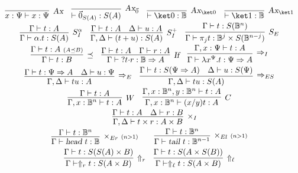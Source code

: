\documentclass[preprint]{elsarticle}
\newcommand\B{\ensuremath{\mathbb B}}
\newcommand\gB{\ensuremath{\Psi}}
\newcommand\ite[3]{{#1}?{#2}\mathord{\cdot}{#3}}
\newcommand\pair[2]{({#1}+{#2})}
\newcommand\head{\text{\sl head}}
\newcommand\tail{\text{\sl tail}}
\newcommand\z[1][A]{\vec 0_{S(#1)}}
\newcommand\tax{\textsl{Ax}}
\newcommand\tif{\textsl{If}}
\begin{document}
\begin{table}
  \centering
  \[
    \def\arraystretch{1.5}
    \begin{array}{c}
      \infer[\tax]
      {x:\gB\vdash x:\gB}
      {}
      \quad
      \infer[\tax_{\vec 0}]
      {\vdash \z:S(A)}
      {}
      \quad
      \infer[\tax_{\ket 0}]
      {\vdash\ket 0:\B}
      {}
      \quad
      \infer[\tax_{\ket 1}]
      {\vdash\ket 1:\B}
      {}
      \\
      \infer[S_I^\alpha]
      {\Gamma\vdash \alpha.t:S(A)}
      {\Gamma\vdash t:A}
      \quad
      \infer[S_I^+]
      {\Gamma,\Delta\vdash\pair tu:S(A)}
      {
      \Gamma\vdash t:A
      &
        \Delta\vdash u:A
        }
        \quad
        \infer[S_E]{\Gamma\vdash\pi_j t:\B^j\times S(\B^{n-j})}
        {\Gamma\vdash t:S(\B^n)}
      \\
      \infer[\preceq]
      {\Gamma\vdash t:B}
      {
      \Gamma\vdash t:A
      \
      {\scriptstyle (A\preceq B)}
      }
      \quad
      \infer[\tif]
      {\Gamma\vdash\ite{}tr:\B\Rightarrow A}
      {\Gamma\vdash t:A & \Gamma\vdash r:A}
      \quad
      \infer[\Rightarrow_I]
      {\Gamma\vdash\lambda x^{\gB}.t:\gB\Rightarrow A}
      {\Gamma,x:\gB\vdash t:A}
      \\
      \infer[\Rightarrow_E]
      {\Gamma,\Delta\vdash tu:A}
      {
      \Gamma\vdash t:\gB\Rightarrow A
      &
        \Delta\vdash u:\gB
        }
        \quad
        \infer[\Rightarrow_{ES}]
        {\Gamma,\Delta\vdash tu:S(A)}
        {
        \Gamma\vdash t:S(\gB\Rightarrow A)
      &
        \Delta\vdash u:S(\gB)
        }
      \\
      \ \quad
      \infer[W]
      {\Gamma,x:\B^n\vdash t:A}
      {\Gamma\vdash t:A}
      \quad
      \infer[C]
      {\Gamma,x:\B^n\vdash (x/y)t:A}
      {\Gamma,x:\B^n,y:\B^n\vdash t:A}
      \quad\
      \\
      \ \quad
      \infer[\times_I]
      {\Gamma,\Delta\vdash t\times r:A\times B}
      {\Gamma\vdash t:A & \Delta\vdash r:B}
         \\~\quad
        \infer[\times_{Er}\ {\scriptstyle (n>1)}]
        {\Gamma\vdash \head~t:\B}
        {\Gamma\vdash t:\B^n}
        \qquad
        \infer[\times_{El}\ {\scriptstyle (n>1)}]
        {\Gamma\vdash \tail~t:\B^{n-1}}
        {\Gamma\vdash t:\B^n}
        \quad\
      \\
      \ \quad
      \infer[\Uparrow_r]
      {\Gamma\vdash \Uparrow_r t:S(A\times B)}
      {\Gamma\vdash t:S(S(A)\times B)}
      \quad
      \infer[\Uparrow_\ell]
      {\Gamma\vdash \Uparrow_\ell t:S(A\times B)}
      {\Gamma\vdash t:S(A\times S(B))}
      \quad\
    \end{array}
  \]
  \caption{Type system.}
  \label{tab:UTS}
\end{table}
\end{document}
